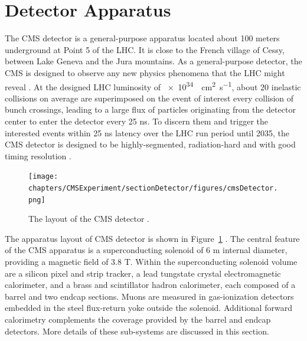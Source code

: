 

\section{Detector Apparatus}
\label{sec:cmsexperiment:detector}



The CMS \cite{exhep:cms:Chatrchyan:2008aa} detector is a general-purpose apparatus located about 100 meters underground at Point 5 of the LHC. It is close to the French village of Cessy, between Lake Geneva and the Jura mountains. As a general-purpose detector, the CMS is designed to observe any new physics phenomena that the LHC might reveal \cite{cms:tdr2:Ball:2007zza}. At the designed LHC luminosity of \SI{e34}{\per\cm\squared \per\s}, about 20 inelastic collisions on average are superimposed on the event of interest every collision of bunch crossings, leading to a large flux of particles originating from the detector center to enter the detector every 25 ns. To discern them and trigger the interested events within 25 ns latency over the LHC run period until 2035, the CMS detector is designed to be highly-segmented, radiation-hard and with good timing resolution \cite{exhep:cms:Chatrchyan:2008aa}.

\begin{figure}[ht]
    \centering
    \texttt{[image: chapters/CMSExperiment/sectionDetector/figures/cmsDetector.png]}
    \caption{The layout of the CMS detector \cite{cms:detectorOverview}.}
    \label{fig:cmsexperiment:detector:detectorOverview}
\end{figure}

The apparatus layout of CMS detector is shown in Figure~\ref{fig:cmsexperiment:detector:detectorOverview} \cite{cms:detectorOverview}. The central feature of the CMS apparatus is a superconducting solenoid of 6 m internal diameter, providing a magnetic field of 3.8 T. Within the superconducting solenoid volume are a silicon pixel and strip tracker, a lead tungstate crystal electromagnetic calorimeter, and a brass and scintillator hadron calorimeter, each composed of a barrel and two endcap sections. Muons are measured in gas-ionization detectors embedded in the steel flux-return yoke outside the solenoid. Additional forward calorimetry complements the coverage provided by the barrel and endcap detectors. More details of these sub-systems are discussed in this section. 


